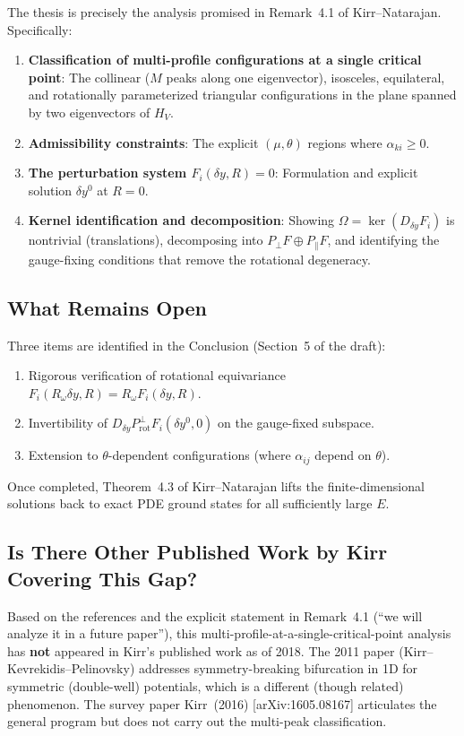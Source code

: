 \documentclass[11pt]{article}
\begin{document}
The thesis is precisely the analysis promised in Remark~4.1 of Kirr--Natarajan. Specifically:

\begin{enumerate}[nosep]
  \item \textbf{Classification of multi-profile configurations at a single critical point}: The collinear ($M$ peaks along one eigenvector), isosceles, equilateral, and rotationally parameterized triangular configurations in the plane spanned by two eigenvectors of $H_V$.
  \item \textbf{Admissibility constraints}: The explicit $(\mu,\theta)$ regions where $\alpha_{ki}\geq 0$.
  \item \textbf{The perturbation system $F_i(\delta y, R)=0$}: Formulation and explicit solution $\delta y^0$ at $R=0$.
  \item \textbf{Kernel identification and decomposition}: Showing $\Omega = \ker(D_{\delta y}F_i)$ is nontrivial (translations), decomposing into $P_\perp F \oplus P_\parallel F$, and identifying the gauge-fixing conditions that remove the rotational degeneracy.
\end{enumerate}

\subsection{What Remains Open}

Three items are identified in the Conclusion (Section~5 of the draft):
\begin{enumerate}[nosep]
  \item Rigorous verification of rotational equivariance $F_i(R_\omega\delta y, R) = R_\omega F_i(\delta y, R)$.
  \item Invertibility of $D_{\delta y}P_{\text{rot}}^\perp F_i(\delta y^0, 0)$ on the gauge-fixed subspace.
  \item Extension to $\theta$-dependent configurations (where $\alpha_{ij}$ depend on $\theta$).
\end{enumerate}
Once completed, Theorem~4.3 of Kirr--Natarajan lifts the finite-dimensional solutions back to exact PDE ground states for all sufficiently large $E$.

\subsection{Is There Other Published Work by Kirr Covering This Gap?}

Based on the references and the explicit statement in Remark~4.1 (``we will analyze it in a future paper''), this multi-profile-at-a-single-critical-point analysis has \textbf{not} appeared in Kirr's published work as of 2018. The 2011 paper (Kirr--Kevrekidis--Pelinovsky) addresses symmetry-breaking bifurcation in 1D for symmetric (double-well) potentials, which is a different (though related) phenomenon. The survey paper Kirr~(2016) [arXiv:1605.08167] articulates the general program but does not carry out the multi-peak classification.
\end{document}
